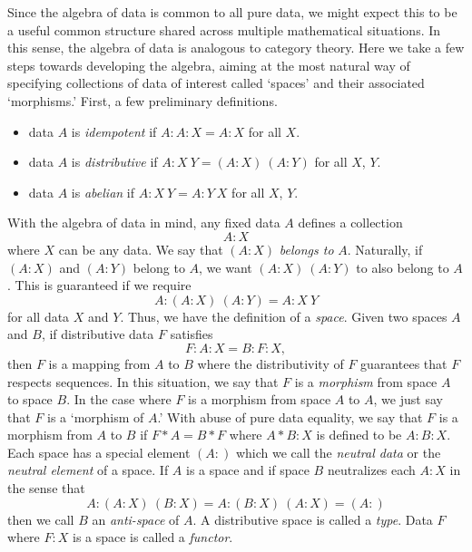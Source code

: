 \documentclass[11pt]{article}
\begin{document}
     Since the algebra of data is common to all pure data, we might expect this to be a useful common structure shared
 across multiple mathematical situations.  In this sense, the algebra of data is analogous to category theory.
 Here we take a few steps towards developing the algebra, aiming at the most natural
 way of specifying collections of data of interest called `spaces' and their associated `morphisms.'  First, a few
 preliminary definitions.
 \begin{itemize}
 \item data $A$ is {\it idempotent} if $A:A:X=A:X$ for all $X$.
 \item data $A$ is {\it distributive} if $A:X\ Y=(A:X)\ (A:Y)$ for all $X$, $Y$.
 \item data $A$ is {\it abelian} if $A:X\ Y=A:Y\ X$ for all $X$, $Y$.
 \end{itemize}
 With the algebra of data in mind, any fixed data $A$ defines a collection
\begin{equation}\label{eqn}
A:X
\end{equation}
where $X$ can be any data.  We say that $(A:X)$ {\it belongs to} $A$.  Naturally,
if $(A:X)$ and $(A:Y)$ belong to $A$, we want $(A:X)\ (A:Y)$ to also belong to $A$.  This is guaranteed if
we require
\begin{equation}\label{eqn}
A : (A : X)\ ( A: Y) = A : X\ Y
\end{equation}
for all data $X$ and $Y$.  Thus, we have the definition of a {\it space}.  Given two spaces $A$ and $B$, if
distributive data $F$ satisfies
\begin{equation}\label{eqn}
F : A : X = B : F : X,
\end{equation}
then $F$ is a mapping from $A$ to $B$ where the distributivity of $F$ guarantees that $F$ respects sequences.
In this situation, we say that $F$ is a {\it morphism} from space $A$ to space $B$.  In the case where $F$
is a morphism from space $A$ to $A$, we just say that $F$ is a `morphism of $A$.'  With abuse of pure data
equality, we say that $F$ is a morphism from $A$ to $B$ if $F*A=B*F$ where $A*B:X$ is defined to be $A:B:X$.
Each space has a special element $(A:)$ which we call the {\it neutral data} or the {\it neutral element} of a space.
If $A$ is a space and if space $B$ neutralizes each $A:X$ in the sense that
\begin{equation}\label{eqn}
A : (A:X)\ (B:X) = A : (B:X)\ (A:X) =  (A:)
\end{equation}
then we call $B$ an {\it anti-space} of $A$.  A distributive space is called a {\it type}.  
Data $F$ where $F:X$ is a space is called a {\it functor}.
\end{document}
